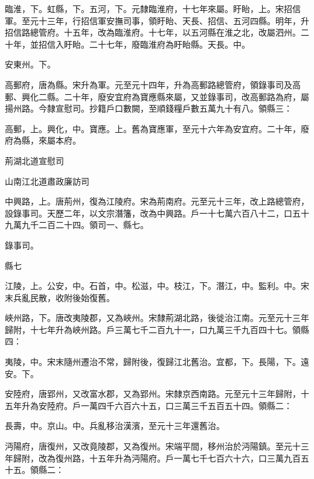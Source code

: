 \begin{pinyinscope}
 臨淮，下。虹縣，下。五河，下。元隸臨淮府，十七年來屬。盱眙，上。宋招信軍。至元十三年，行招信軍安撫司事，領盱眙、天長、招信、五河四縣。明年，升招信路總管府。十五年，改為臨淮府。十七年，以五河縣在淮之北，改屬泗州。二十年，並招信入盱眙。二十七年，廢臨淮府為盱眙縣。天長。中。



 安東州。下。



 高郵府，唐為縣。宋升為軍。元至元十四年，升為高郵路總管府，領錄事司及高郵、興化二縣。二十年，廢安宜府為寶應縣來屬，又並錄事司，改高郵路為府，屬揚州路。今隸宣慰司。抄籍戶口數闕，至順錢糧戶數五萬九十有八。領縣三：



 高郵，上。興化，中。寶應。上。舊為寶應軍，至元十六年為安宜府。二十年，廢府為縣，來屬本府。



 荊湖北道宣慰司



 山南江北道肅政廉訪司



 中興路，上。唐荊州，復為江陵府。宋為荊南府。元至元十三年，改上路總管府，設錄事司。天歷二年，以文宗潛籓，改為中興路。戶一十七萬六百八十二，口五十九萬九千二百二十四。領司一、縣七。



 錄事司。



 縣七



 江陵，上。公安，中。石首，中。松滋，中。枝江，下。潛江，中。監利。中。宋末兵亂民散，收附後始復舊。



 峽州路，下。唐改夷陵郡，又為峽州。宋隸荊湖北路，後徙治江南。元至元十三年歸附，十七年升為峽州路。戶三萬七千二百九十一，口九萬三千九百四十七。領縣四：



 夷陵，中。宋末隨州遷治不常，歸附後，復歸江北舊治。宜都，下。長陽，下。遠安。下。



 安陸府，唐郢州，又改富水郡，又為郢州。宋隸京西南路。元至元十三年歸附，十五年升為安陸府。戶一萬四千六百六十五，口三萬三千五百五十四。領縣二：



 長壽，中。京山。中。兵亂移治漢濱，至元十三年還舊治。



 沔陽府，唐復州，又改竟陵郡，又為復州。宋端平間，移州治於沔陽鎮。至元十三年歸附，改為復州路，十五年升為沔陽府。戶一萬七千七百六十六，口三萬九百五十五。領縣二：




\end{pinyinscope}
